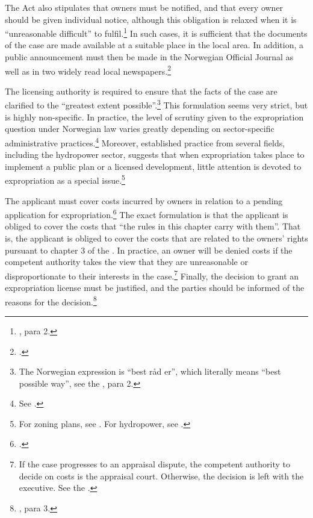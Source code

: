 The Act also stipulates that owners must be notified, and that every owner should be given individual notice, although this obligation is relaxed when it is ``unreasonable difficult'' to fulfil.\footnote{\dni\cite[12]{ea59}, para 2.} In such cases, it is sufficient that the documents of the case are made available at a suitable place in the local area. In addition, a public announcement must then be made in the Norwegian Official Journal as well as in two widely read local newspapers.\footnote{\dni\cite[12]{ea59}.}

The licensing authority is required to ensure that the facts of the case are clarified to the ``greatest extent possible''.\footnote{The Norwegian expression is ``best råd er'', which literally means ``best possible way'', see the \dni\cite[12]{ea59}, para 2.} This formulation seems very strict, but is highly non-specific. In practice, the level of scrutiny given to the expropriation question under Norwegian law varies greatly depending on sector-specific administrative practices.\footnote{See \cite[380-381]{dyrkolbotn15b}.} Moreover, established practice from several fields, including the hydropower sector, suggests that when expropriation takes place to implement a public plan or a licensed development, little attention is devoted to expropriation as a special issue.\footnote{For zoning plans, see \cite{namsos98,bo99}. For hydropower, see \cite{jorpeland11}.}

The applicant must cover costs incurred by owners in relation to a pending application for expropriation.\footnote{\dni\cite[15]{ea59}.} The exact formulation is that the applicant is obliged to cover the costs that ``the rules in this chapter carry with them''. That is, the applicant is obliged to cover the costs that are related to the owners' rights pursuant to chapter 3 of the \cite{ea59}. In practice, an owner will be denied costs if the competent authority takes the view that they are unreasonable or disproportionate to their interests in the case.\footnote{If the case progresses to an appraisal dispute, the competent authority to decide on costs is the appraisal court. Otherwise, the decision is left with the executive. See the \dni\cite[15]{ea59}.} Finally, the decision to grant an expropriation license must be justified, and the parties should be informed of the reasons for the decision.\footnote{\dni\cite[12]{ea59}, para 3.}

